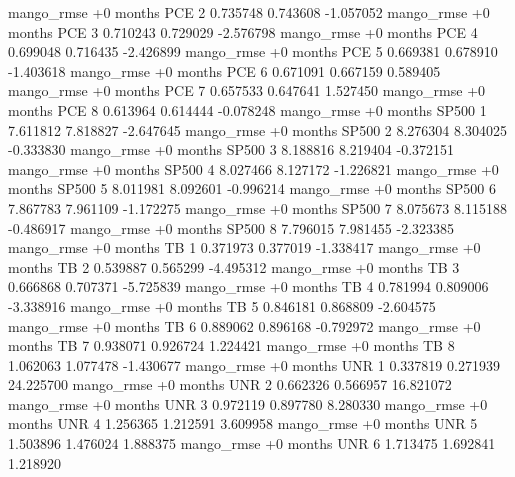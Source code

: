 mango_rmse +0 months      PCE                 2 0.735748       0.743608          -1.057052
mango_rmse +0 months      PCE                 3 0.710243       0.729029          -2.576798
mango_rmse +0 months      PCE                 4 0.699048       0.716435          -2.426899
mango_rmse +0 months      PCE                 5 0.669381       0.678910          -1.403618
mango_rmse +0 months      PCE                 6 0.671091       0.667159           0.589405
mango_rmse +0 months      PCE                 7 0.657533       0.647641           1.527450
mango_rmse +0 months      PCE                 8 0.613964       0.614444          -0.078248
mango_rmse +0 months    SP500                 1 7.611812       7.818827          -2.647645
mango_rmse +0 months    SP500                 2 8.276304       8.304025          -0.333830
mango_rmse +0 months    SP500                 3 8.188816       8.219404          -0.372151
mango_rmse +0 months    SP500                 4 8.027466       8.127172          -1.226821
mango_rmse +0 months    SP500                 5 8.011981       8.092601          -0.996214
mango_rmse +0 months    SP500                 6 7.867783       7.961109          -1.172275
mango_rmse +0 months    SP500                 7 8.075673       8.115188          -0.486917
mango_rmse +0 months    SP500                 8 7.796015       7.981455          -2.323385
mango_rmse +0 months       TB                 1 0.371973       0.377019          -1.338417
mango_rmse +0 months       TB                 2 0.539887       0.565299          -4.495312
mango_rmse +0 months       TB                 3 0.666868       0.707371          -5.725839
mango_rmse +0 months       TB                 4 0.781994       0.809006          -3.338916
mango_rmse +0 months       TB                 5 0.846181       0.868809          -2.604575
mango_rmse +0 months       TB                 6 0.889062       0.896168          -0.792972
mango_rmse +0 months       TB                 7 0.938071       0.926724           1.224421
mango_rmse +0 months       TB                 8 1.062063       1.077478          -1.430677
mango_rmse +0 months      UNR                 1 0.337819       0.271939          24.225700
mango_rmse +0 months      UNR                 2 0.662326       0.566957          16.821072
mango_rmse +0 months      UNR                 3 0.972119       0.897780           8.280330
mango_rmse +0 months      UNR                 4 1.256365       1.212591           3.609958
mango_rmse +0 months      UNR                 5 1.503896       1.476024           1.888375
mango_rmse +0 months      UNR                 6 1.713475       1.692841           1.218920
